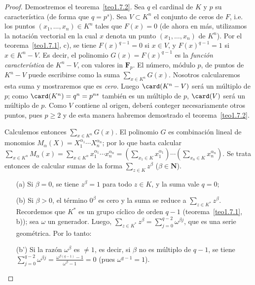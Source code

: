 \documentclass[oneside,bibtotoc,leqno,spanish]{amsbook}
\newcommand{\NN}{\mathbf{N}}
\newcommand{\FF}{\mathbf{F}}
\numberwithin{equation}{section}
\theoremstyle{defi}
\theoremstyle{note}
\theoremstyle{rem}
\numberwithin{theorem}{section}
\numberwithin{proposition}{section}
\numberwithin{definition}{section}
\numberwithin{lemma}{section}
\numberwithin{corollary}{section}
\numberwithin{example}{section}
\numberwithin{footnote}{section}%
\begin{document}
\begin{proof}
Demostremos el teorema~\ref{teo1.7.2}. Sea $q$ el cardinal de $K$ y $p$ su caracter\'istica (de forma que
$q = p^{s}$). Sea $V\subset K^{n}$ el conjunto de ceros de $F$, i.e. los puntos $(x_{1},\dots,x_{n})\in K^{n}$
tales que $F(x) = 0$ (de ahora en m\'as, utilizamos la notaci\'on vectorial en la cual $x$ denota
un punto $(x_{1},\dots,x_{n})$ de $K^{n}$). Por el teorema~\ref{teo1.7.1}, c),
se tiene $F(x)^{q-1} = 0$ si $x\in V$,
y $F(x)^{q-1} = 1$ si $x\in K^{n}-V$. Es decir, el polinomio $G(x) = F(x)^{q-1}$ es la
{\em funci\'on caracter\'istica} de $K^{n}-V$, con valores in $\FF_{p}$. El n\'umero, m\'odulo $p$,
de puntos de $K^{n}-V$ puede escribirse como la suma $\sum_{x\in K^{n}}G(x)$. Nosotros calcularemos esta
suma y mostraremos que es {\em cero.} Luego $\card(K^{n}-V)$ ser\'a un m\'ultiplo de $p$; como $\card(K^{n})
=q^{n}=p^{ns}$ tambi\'en es un m\'ultiplo de $p$, $\card(V)$ ser\'a un m\'ultiplo de $p$. Como $V$ contiene
al origen, deber\'a conteger necesariamente otros puntos, pues $p\geq 2$ y de esta manera habremos demostrado
el teorema~\ref{teo1.7.2}.

Calculemos entonces $\sum_{x\in K^{n}}G(x)$. El polinomio $G$ es combinaci\'on lineal de monomios
$M_{\alpha}(X) = X_{1}^{\alpha_{1}}\cdots X_{n}^{\alpha_{n}}$; por lo que basta calcular
$\sum_{x\in K^{n}}M_{\alpha}(x) = \sum_{x\in K^{n}}x_{1}^{\alpha_{1}}\cdots x_{n}^{\alpha_{n}}
= \left(\sum_{x_{1}\in K}x_{1}^{\alpha_{1}}\right)\cdots\left(\sum_{x_{n}\in K}x_{n}^{\alpha_{n}}\right)$.
Se trata entonces de calcular sumas de la forma $\sum_{z\in K}z^{\beta}$ ($\beta\in\NN$).

\begin{enumerate}
\item[(a)] Si $\beta = 0$, se tiene $z^{\beta} =1$ para todo $z\in K$, y la suma vale $q = 0$;

\item[(b)] Si $\beta > 0$, el t\'ermino $0^{\beta}$ es cero y la suma se reduce a $\sum_{z\in K^{*}}z^{\beta}$. Recordemos
que $K^{*}$ es un grupo c\'iclico de orden $q-1$ (teorema~\ref{teo1.7.1}, b));
sea $\omega$ un generador. Luego,
$\sum_{z\in K^{*}}z^{\beta} = \sum_{j=0}^{q-2}\omega^{\beta j}$, que es una serie geom\'etrica. Por lo tanto:

\item[(b')] Si la raz\'on $\omega^{\beta}$ es $\neq 1$, es decir, si $\beta$ no es m\'ultiplo de $q-1$, se tiene
$\sum_{j=0}^{q-2}\omega^{\beta j} = \frac{\omega^{\beta(q-1)}-1}{\omega^{\beta}-1} = 0$ (pues $\omega^{q-1} = 1$).


\end{enumerate}
\end{proof}
\end{document}
